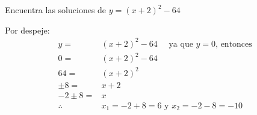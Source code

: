 Encuentra las soluciones de $y=(x+2)^2-64$

\begin{solutionbox}{5cm}
    Por despeje:%
    \begin{align*}
        y=         & (x+2)^2-64 \quad \text{ ya que $y=0$, entonces } \\
        0=         & (x+2)^2-64                                       \\
        64=        & (x+2)^2                                          \\
        \pm 8=     & x+2                                              \\
        -2 \pm 8=  & x                                                \\
        \therefore & x_1=-2+8 =6 \text{ y } x_2=-2-8=-10
    \end{align*}
\end{solutionbox}
